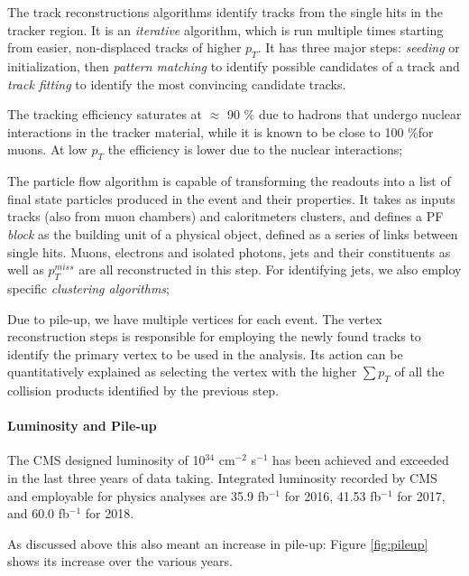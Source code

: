 \begin{outline}
    \1 The track reconstructions algorithms identify tracks from the single hits in the tracker region. It is an \emph{iterative} algorithm, which is run multiple times starting from easier, non-displaced tracks of higher $p_T$. It has three major steps: \emph{seeding} or initialization, then \emph{pattern matching} to identify possible candidates of a track and \emph{track fitting} to identify the most convincing candidate tracks.
    
    The tracking efficiency saturates at $\approx$ 90 $\%$ due to hadrons that undergo nuclear interactions in the tracker material, while it is known to be close to 100 $\%$for muons. At low $p_T$ the efficiency is lower due to the nuclear interactions;
    
    \1 The particle flow algorithm is capable of transforming the readouts into a list of final state particles produced in the event and their properties. It takes as inputs tracks (also from muon chambers) and caloritmeters clusters, and defines a PF \emph{block} as the building unit of a physical object, defined as a series of links between single hits. Muons, electrons and isolated photons, jets and their constituents as well as $p_T^{miss}$ are all reconstructed in this step. For identifying jets, we also employ specific \emph{clustering algorithms}; 
    
    \1 Due to pile-up, we have multiple vertices for each event. The vertex reconstruction steps is responsible for employing the newly found tracks to identify the primary vertex to be used in the analysis. Its action can be quantitatively explained as selecting the vertex with the higher $\sum p_T$ of all the collision products identified by the previous step.
\end{outline}

\paragraph{Luminosity and Pile-up}

 The CMS designed luminosity of 10$^{34}$ cm$^{-2}$ s$^{-1}$ has been achieved and exceeded in the last three years of data taking. Integrated luminosity recorded by CMS and employable for physics analyses are 35.9 fb$^{-1}$ for 2016, 41.53 fb$^{-1}$ for 2017, and 60.0 fb$^{-1}$ for 2018.

As discussed above this also meant an increase in pile-up: Figure \ref{fig:pileup} shows its increase over the various years.

